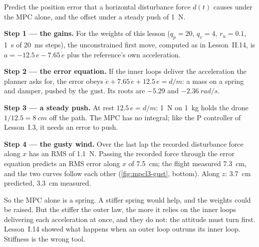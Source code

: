 \begin{example}
\label{ex:mpcl3-stiff}
Predict the position error that a horizontal disturbance force $d(t)$ causes under the MPC alone, and the offset under a steady push of \SI{1}{N}.

\textbf{Step 1 — the gains.} For the weights of this lesson ($q_p = 20$, $q_v = 4$, $r_u = 0.1$, \SI{1}{s} of \SI{20}{ms} steps), the unconstrained first move, computed as in Lesson~II.14, is $a = -12.5\,e - 7.65\,\dot e$ plus the reference's own acceleration.

\textbf{Step 2 — the error equation.} If the inner loops deliver the acceleration the planner asks for, the error obeys $\ddot e + 7.65\,\dot e + 12.5\,e = d/m$: a mass on a spring and damper, pushed by the gust. Its roots are $-5.29$ and $\SI{-2.36}{rad/s}$.

\textbf{Step 3 — a steady push.} At rest $12.5\,e = d/m$: \SI{1}{N} on \SI{1}{kg} holds the drone $1/12.5 = \SI{8}{cm}$ off the path. The MPC has no integral; like the P controller of Lesson~I.3, it needs an error to push.

\textbf{Step 4 — the gusty wind.} Over the last lap the recorded disturbance force along $x$ has an RMS of \SI{1.1}{N}. Passing the recorded force through the error equation predicts an RMS error along $x$ of \SI{7.5}{cm}; the flight measured \SI{7.3}{cm}, and the two curves follow each other (\cref{fig:mpcl3-gust}, bottom). Along $z$: \SI{3.7}{cm} predicted, \SI{3.3}{cm} measured.
\end{example}


So the MPC alone is a spring. A stiffer spring would help, and the weights could be raised. But the stiffer the outer law, the more it relies on the inner loops delivering each acceleration at once, and they do not: the attitude must turn first. Lesson~I.14 showed what happens when an outer loop outruns its inner loop. Stiffness is the wrong tool.

